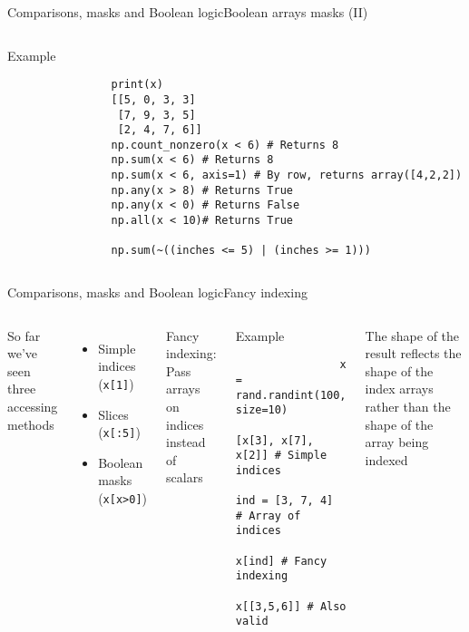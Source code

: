 \documentclass[10pt,compress]{beamer} %
\begin{document}
\begin{frame}[fragile]{Comparisons, masks and Boolean logic}{Boolean arrays masks (II)}
	\begin{columns}
		\begin{exampleblock}{\footnotesize{Example}}
		\vspace{-0.2cm} 
			\begin{lstlisting}
				print(x)
				[[5, 0, 3, 3]
				 [7, 9, 3, 5]
				 [2, 4, 7, 6]]
				np.count_nonzero(x < 6) # Returns 8
				np.sum(x < 6) # Returns 8
				np.sum(x < 6, axis=1) # By row, returns array([4,2,2])
				np.any(x > 8) # Returns True
				np.any(x < 0) # Returns False
				np.all(x < 10)# Returns True

				np.sum(~((inches <= 5) | (inches >= 1)))
			\end{lstlisting}
		\vspace{-0.2cm} 
		\end{exampleblock}
	\end{columns}
\end{frame}

\begin{frame}[fragile]{Comparisons, masks and Boolean logic}{Fancy indexing}
	\begin{columns}
 	   \column{0.4\textwidth}
	So far we've seen three accessing methods
	\begin{itemize}
		\item Simple indices (\texttt{x[1]})
		\item Slices (\texttt{x[:5]})
		\item Boolean masks (\texttt{x[x>0]})
	\end{itemize}
	Fancy indexing: Pass arrays on indices instead of scalars
 	   \column{0.6\textwidth}
		\begin{exampleblock}{\footnotesize{Example}}
		\vspace{-0.2cm} 
			\begin{lstlisting}
				x = rand.randint(100, size=10)
				[x[3], x[7], x[2]] # Simple indices
				ind = [3, 7, 4] # Array of indices
				x[ind] # Fancy indexing
				x[[3,5,6]] # Also valid
			\end{lstlisting}
		\vspace{-0.2cm} 
		\end{exampleblock}

		\footnotesize{
		\begin{alertblock}{}
		The shape of the result reflects the shape of the index arrays rather than the shape of the array being indexed
		\end{alertblock}
		}
	\end{columns}
\end{frame}
\end{document}
